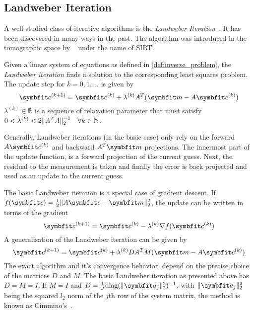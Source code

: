 \subsection{Landweber Iteration}\label{subsec:landweber_iteration}

A well studied class of iterative algorithms is the \textit{Landweber
	Iteration}~\cite{landweber_iteration_1951}. It has been discovered in many ways in the past.
The algorithm was introduced in the tomographic space by
\citeauthor{gilbert_iterative_1972}~\cite{gilbert_iterative_1972} under the name of
\gls{SIRT}.

\begin{definition}\label{def:landweber_iteration}
	Given a linear system of equations as defined in \autoref{def:inverse_problem}, the
	\textit{Landweber iteration} finds a solution to the corresponding least squares problem. The update
	step for \(k = 0, 1, \dots\) is given by
	\[
		\mvec{c}^{(k+1)} = \mvec{c}^{(k)} + \lambda^{(k)} A^T(\mvec{m} - A\mvec{c}^{(k)})
	\]
	\(\lambda^{(k)} \in \mathbb{R}\) is a sequence of relaxation parameter that must satisfy
	\(0 < \lambda^{(k)} < 2 \norm{A^T A}_2^{-1}\quad \forall k \in \mathbb{N}\).
\end{definition}

Generally, Landweber iterations (in the basic case) only rely on the forward \(A\mvec{c}^{(k)}\) and backward
\(A^T \mvec{m}\) projections. The innermost part of the update function, is a forward projection of the
current guess. Next, the residual to the measurement is taken and finally the error is back
projected and used as an update to the current guess.

The basic Landweber iteration is a special case of gradient descent. If \(f(\mvec{c}) = \frac{1}{2}
\norm{A\mvec{c} - \mvec{m}}_2^2\), the update can be written in terms of the gradient
\begin{equation}
	\mvec{c}^{(k+1)} = \mvec{c}^{(k)} - \lambda^{(k)} \nabla f(\mvec{c}^{(k)})
\end{equation}
A generalisation of the Landweber iteration can be given by
\begin{equation}
	\mvec{c}^{(k+1)} = \mvec{c}^{(k)} + \lambda^{(k)} DA^TM(\mvec{m} - A\mvec{c}^{(k)})
\end{equation}
The exact algorithm and it's convergence behavior, depend on the precise choice of the matrices
\(D\) and \(M\). The basic Landweber iteration as presented above has \(D = M = I\). If \(M = I\)
and \(D = \frac{1}{J} \text{diag}(\norm{\mvec{a}_j}^2_2)^{-1}\), with \(\norm{\mvec{a}_j}^2_2\)
being the squared \(l_2\) norm of the \(j\)th row of the system matrix, the method is known as
Cimmino's~\cite[Chapter~6.1]{hansen_discrete_2010}.

